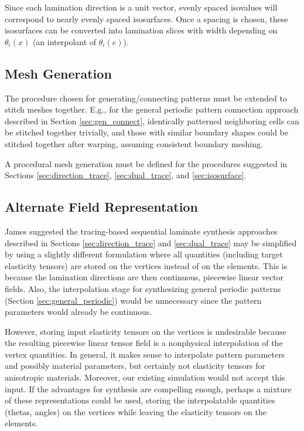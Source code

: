 \documentclass[10pt]{article}
\begin{document}
Since each lamination direction is a unit vector, evenly
spaced isovalues will correspond to nearly evenly spaced isosurfaces.
Once a spacing is chosen, these isosurfaces can be converted into lamination
slices with width depending on $\theta_i(x)$ (an interpolant of $\theta_i(e)$).

\subsection{Mesh Generation}
The procedure chosen for generating/connecting patterns must be
extended to stitch meshes together. E.g., for the general periodic pattern
connection approach described in Section \ref{sec:gen_connect}, identically
patterned neighboring cells can be stitched together trivially, and those with
similar boundary shapes could be stitched together after warping, assuming
consistent boundary meshing.

A procedural mesh generation must be defined for the procedures suggested
in Sections \ref{sec:direction_trace}, \ref{sec:dual_trace}, and
\ref{sec:isosurface}.

\subsection{Alternate Field Representation}
James suggested the tracing-based sequential laminate synthesis approaches
described in Sections \ref{sec:direction_trace} and \ref{sec:dual_trace} may be
simplified by using a slightly different formulation where all quantities
(including target elasticity tensors) are stored on the vertices instead of on
the elements. This is because the lamination directions are then continuous,
piecewise linear vector fields. Also, the interpolation stage for synthesizing
general periodic patterns (Section \ref{sec:general_periodic}) would be
unnecessary since the pattern parameters would already be continuous.

However, storing input elasticity tensors on the vertices is undesirable because
the resulting piecewise linear tensor field is a nonphysical interpolation of
the vertex quantities. In general, it makes sense to interpolate pattern
parameters and possibly material parameters, but certainly not elasticity
tensors for anisotropic materials. Moreover, our existing simulation would not
accept this input. If the advantages for synthesis are compelling enough,
perhaps a mixture of these representations could be used, storing the
interpolatable quantities (thetas, angles) on the vertices while leaving the
elasticity tensors on the elements.
\end{document}
